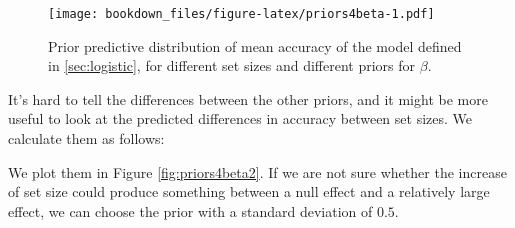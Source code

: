 \documentclass[12pt,]{krantz}
\newenvironment{Shaded}{\begin{snugshade}}{\end{snugshade}}
\newcommand{\DataTypeTok}[1]{\textcolor[rgb]{0.13,0.29,0.53}{#1}}
\newcommand{\DecValTok}[1]{\textcolor[rgb]{0.00,0.00,0.81}{#1}}
\newcommand{\KeywordTok}[1]{\textcolor[rgb]{0.13,0.29,0.53}{\textbf{#1}}}
\newcommand{\NormalTok}[1]{#1}
\newcommand{\OperatorTok}[1]{\textcolor[rgb]{0.81,0.36,0.00}{\textbf{#1}}}
\newcommand{\StringTok}[1]{\textcolor[rgb]{0.31,0.60,0.02}{#1}}
\theoremstyle{definition}
\theoremstyle{definition}
\theoremstyle{definition}
\theoremstyle{remark}
\begin{document}
\begin{Shaded}
\end{Shaded}

\begin{figure}
\centering
\texttt{[image: bookdown\_files/figure-latex/priors4beta-1.pdf]}
\caption{\label{fig:priors4beta}Prior predictive distribution of mean accuracy of the model defined in \ref{sec:logistic}, for different set sizes and different priors for \(\beta\).}
\end{figure}

It's hard to tell the differences between the other priors, and it might be more useful to look at the predicted differences in accuracy between set sizes. We calculate them as follows:

\begin{Shaded}
\end{Shaded}

We plot them in Figure \ref{fig:priors4beta2}. If we are not sure whether the increase of set size could produce something between a null effect and a relatively large effect, we can choose the prior with a standard deviation of \(0.5\).



\begin{Shaded}
\end{Shaded}
\end{document}
